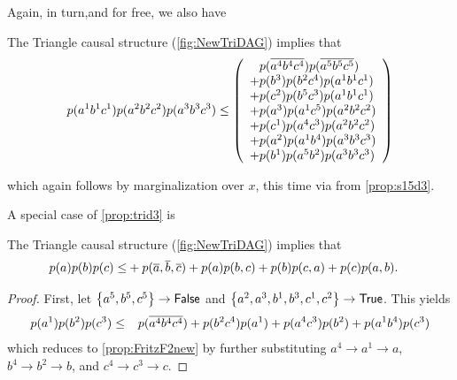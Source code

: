 Again, in turn,and for free, we also have
\begin{prop}\label{prop:trid3}
The Triangle causal structure (\cref{fig:NewTriDAG}) implies that
\begin{align*}
\p{a^1 b^1 c^1} \p{a^2 b^2 c^2} \p{a^3 b^3 c^3}
\leq
\lparens{
\hphantom{+}\p{\n{a^4} \n{b^4} \n{c^4}} \p{\n{a^5} \n{b^5} \n{c^5}}
\\+\p{b^3} \p{b^2 c^4} \p{a^1 b^1 c^1}
\\+\p{c^2} \p{b^5 c^3} \p{a^1 b^1 c^1}
\\+\p{a^3} \p{a^1 c^5} \p{a^2 b^2 c^2}
\\+\p{c^1} \p{a^4 c^3} \p{a^2 b^2 c^2}
\\+\p{a^2} \p{a^1 b^4} \p{a^3 b^3 c^3}
\\+\p{b^1} \p{a^5 b^2} \p{a^3 b^3 c^3}
}
\end{align*}
\end{prop}
which again follows by marginalization over $x$, this time via from \cref{prop:s15d3}.



A special case of \cref{prop:trid3} is
\begin{prop} \label{prop:FritzF2new}
The Triangle causal structure (\cref{fig:NewTriDAG}) implies that
\begin{align*}\begin{split}
\p{a}\p{b}\p{c}\leq&+\p{\n{a},\n{b},\n{c}}+ \p{a}\p{b,c} + \p{b}\p{c,a}+ \p{c}\p{a,b}.
\end{split}\end{align*}
\end{prop}
\begin{proof}
First, let $\brackets{a^5,b^5,c^5}\to\mathsf{False}$ and $\brackets{a^2,a^3,b^1,b^3,c^1,c^2}\to\mathsf{True}$. This yields
\begin{align}
\p{a^1 } \p{b^2} \p{c^3}
\leq
{
\hphantom{+}\p{\n{a^4} \n{b^4} \n{c^4}} 
+\p{b^2 c^4} \p{a^1}
+\p{a^4 c^3} \p{b^2}
+\p{a^1 b^4} \p{c^3}
}
\end{align}
which reduces to \cref{prop:FritzF2new} by further substituting $a^4\to a^1\to a$, $b^4\to b^2\to b$, and $c^4\to c^3\to c$.
\end{proof}


